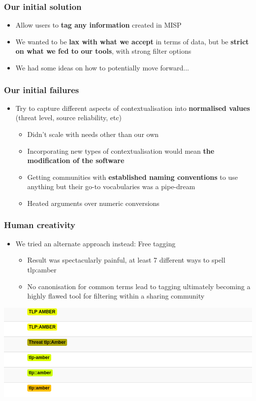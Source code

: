 \begin{frame}
\frametitle{Our initial solution}
\begin{itemize}
       \item Allow users to {\bf tag any information} created in MISP
       \item We wanted to be {\bf lax with what we accept} in terms of data, but be {\bf strict on what we fed to our tools}, with strong filter options
       \item We had some ideas on how to potentially move forward...
\end{itemize}
\end{frame}

\begin{frame}
\frametitle{Our initial failures}
\begin{itemize}
       \item Try to capture different aspects of contextualisation into {\bf normalised values} (threat level, source reliability, etc)
        \begin{itemize}
                \item Didn't scale with needs other than our own
                \item Incorporating new types of contextualisation would mean {\bf the modification of the software}
                \item Getting communities with {\bf established naming conventions} to use anything but their go-to vocabularies was a pipe-dream
                \item Heated arguments over numeric conversions
        \end{itemize}
\end{itemize}
\end{frame}

\begin{frame}
  \frametitle{Human creativity}
  \begin{itemize}
    \item We tried an alternate approach instead: Free tagging
    \begin{itemize}
      \item Result was spectacularly painful, at least 7 different ways to spell tlp:amber
      \item No canonisation for common terms lead to tagging ultimately becoming a highly flawed tool for filtering within a sharing community
    \end{itemize}
  \end{itemize}
  \begin{center}
    \includegraphics[scale=0.24]{creativity.png}
  \end{center}
\end{frame}

